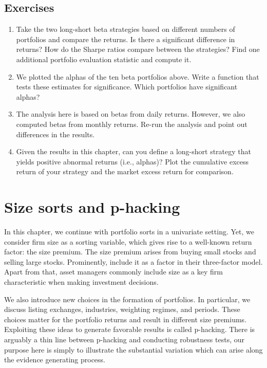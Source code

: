 \documentclass[
]{book}
\providecommand{\tightlist}{%
  \setlength{\itemsep}{0pt}\setlength{\parskip}{0pt}}
\begin{document}
\hypertarget{exercises-4}{%
\section{Exercises}\label{exercises-4}}

\begin{enumerate}
\def\labelenumi{\arabic{enumi}.}
\tightlist
\item
  Take the two long-short beta strategies based on different numbers of portfolios and compare the returns. Is there a significant difference in returns? How do the Sharpe ratios compare between the strategies? Find one additional portfolio evaluation statistic and compute it.
\item
  We plotted the alphas of the ten beta portfolios above. Write a function that tests these estimates for significance. Which portfolios have significant alphas?
\item
  The analysis here is based on betas from daily returns. However, we also computed betas from monthly returns. Re-run the analysis and point out differences in the results.
\item
  Given the results in this chapter, can you define a long-short strategy that yields positive abnormal returns (i.e., alphas)? Plot the cumulative excess return of your strategy and the market excess return for comparison.
\end{enumerate}

\hypertarget{size-sorts-and-p-hacking}{%
\chapter{Size sorts and p-hacking}\label{size-sorts-and-p-hacking}}

In this chapter, we continue with portfolio sorts in a univariate setting. Yet, we consider firm size as a sorting variable, which gives rise to a well-known return factor: the size premium. The size premium arises from buying small stocks and selling large stocks. Prominently, \citet{Fama1993} include it as a factor in their three-factor model. Apart from that, asset managers commonly include size as a key firm characteristic when making investment decisions.

We also introduce new choices in the formation of portfolios. In particular, we discuss listing exchanges, industries, weighting regimes, and periods. These choices matter for the portfolio returns and result in different size premiums. Exploiting these ideas to generate favorable results is called p-hacking.
There is arguably a thin line between p-hacking and conducting robustness tests, our purpose here is simply to illustrate the substantial variation which can arise along the evidence generating process.
\end{document}
